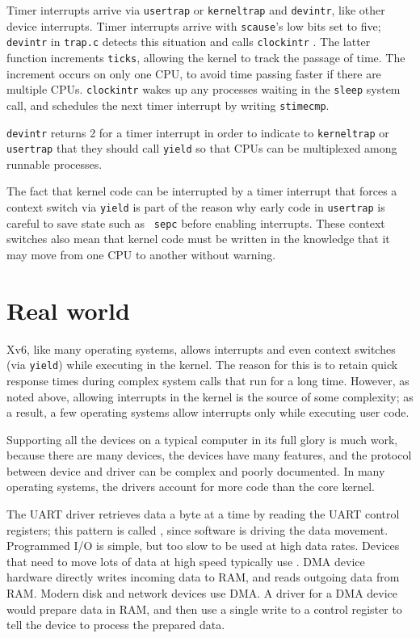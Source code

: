 Timer interrupts arrive via {\tt usertrap} or {\tt kerneltrap}
and {\tt devintr}, like other device interrupts.
Timer interrupts arrive with {\tt scause}'s low bits set to
five; {\tt devintr} in {\tt trap.c} detects this situation
and calls {\tt clockintr}
.
The latter function increments {\tt ticks},
allowing the kernel to track the
passage of time. The increment occurs on only one CPU, to avoid time
passing faster if there are multiple CPUs.
{\tt clockintr} wakes up any processes waiting in the {\tt sleep}
system call,
and schedules the next timer interrupt by writing
{\tt stimecmp}.

{\tt devintr} returns 2 for a timer interrupt
in order to indicate to {\tt kerneltrap}
or {\tt usertrap} that they should call {\tt yield} so that
CPUs can be multiplexed among runnable processes.

The fact that kernel code can be interrupted by a timer interrupt that
forces a context switch via {\tt yield} is part of the reason why
early code in {\tt usertrap} is careful to save state such as {\tt
  sepc} before enabling interrupts. These context switches also mean
that kernel code must be written in the knowledge that it may move
from one CPU to another without warning.

\section{Real world}

Xv6, like many operating systems, allows interrupts and even context
switches (via {\tt yield}) while executing in the kernel. The reason
for this is to retain quick response times during complex system calls
that run for a long time. However, as noted above, allowing interrupts
in the kernel is the source of some complexity; as a result, a few
operating systems allow interrupts only while executing user code.

Supporting all the devices on a typical computer in its full glory is
much work, because there are many devices, the devices have many
features, and the protocol between device and driver can be complex
and poorly documented. In many operating systems, the drivers account
for more code than the core kernel.

The UART driver retrieves data a byte at a time by reading the UART
control registers; this pattern is called , since
software is driving the data movement. Programmed I/O is simple, but
too slow to be used at high data rates. Devices that need to move lots
of data at high speed typically use .
DMA device hardware directly writes incoming data to RAM, and reads
outgoing data from RAM. Modern disk and network devices use DMA. A
driver for a DMA device would prepare data in RAM, and then use a
single write to a control register to tell the device to process the
prepared data.

